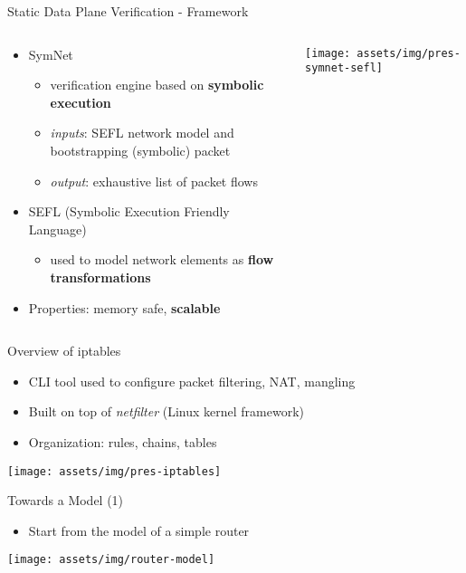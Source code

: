 \documentclass{beamer}
\begin{document}
\begin{frame}{Static Data Plane Verification - Framework}
  \begin{columns}
    \begin{column}{.6\textwidth}
      \begin{itemize}
        \item SymNet
          \begin{itemize}
            \item[--] verification engine based on \textbf{symbolic execution}
            \item[--] \emph{inputs}: SEFL network model and bootstrapping
              (symbolic) packet
            \item[--] \emph{output}: exhaustive list of packet flows
          \end{itemize}
        \item SEFL (Symbolic Execution Friendly Language)
          \begin{itemize}
            \item[--] used to model network elements as \textbf{flow
              transformations}
          \end{itemize}
        \item Properties: memory safe, \textbf{scalable}
      \end{itemize}
    \end{column}

    \begin{column}{.4\textwidth}
      \centering
      \texttt{[image: assets/img/pres-symnet-sefl]}
    \end{column}
  \end{columns}
\end{frame}

\begin{frame}{Overview of iptables}
  \begin{itemize}
    \item CLI tool used to configure packet filtering, NAT, mangling
    \item Built on top of \emph{netfilter} (Linux kernel framework)
    \item Organization: rules, chains, tables
  \end{itemize}

  \centering
  \texttt{[image: assets/img/pres-iptables]}
\end{frame}

\begin{frame}[t]{Towards a Model (1)}
  \begin{itemize}
    \item[1.] Start from the model of a simple router
  \end{itemize}

  \vspace*{0.8cm}

  \centering
  \texttt{[image: assets/img/router-model]}
\end{frame}
\end{document}
